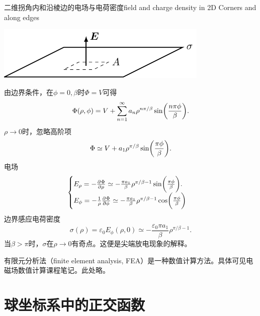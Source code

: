 \begin{example}{二维拐角内和沿棱边的电场与电荷密度}{field and charge density in 2D Corners and along edges}
    \begin{center}
        \includegraphics[page=13]{figures/tikz/layouts.pdf}
    \end{center}
    由边界条件，在$\phi=0,\beta$时$\Phi=V$可得
    \begin{equation}
        \Phi(\rho,\phi)=V+\sum_{n=1}^\infty a_n\rho^{n\pi/\beta}\sin\biggl(\frac{n\pi\phi}\beta\biggr).
    \end{equation}
    $\rho\to0$时，忽略高阶项
    \[
        \Phi\simeq V+a_1\rho^{\pi/\beta}\sin\biggl(\frac{\pi\phi}\beta\biggr).
    \]
    电场 
    \begin{equation}
        \begin{cases}
            E_\rho=-\frac{\partial^{{}}\Phi}{\partial{\rho}^{{}}}\simeq-\frac{\pi a_1}\beta\rho^{\pi/\beta-1}\sin\biggl(\frac{\pi\phi}\beta\biggr).\\
            E_\phi=-\frac1\rho\frac{\partial^{{}}\Phi}{\partial{\phi}^{{}}}\simeq-\frac{\pi a_1}\beta\rho^{\pi/\beta-1}\cos\biggl(\frac{\pi\phi}\beta\biggr)
        \end{cases}
    \end{equation}
    边界感应电荷密度
    \begin{equation}
        \sigma(\rho)=\varepsilon_0E_\phi(\rho,0)\simeq-\frac{\varepsilon_0\pi a_1}\beta\rho^{\pi/\beta-1}.
    \end{equation}
    当$\beta>\pi$时，$\sigma$在$\rho\to0$有奇点。这便是尖端放电现象的解释。
\end{example}

\label{sec:finite element analysis}

有限元分析法（finite element analysis, FEA）是一种数值计算方法。具体可见电磁场数值计算课程笔记。此处略。

\clearpage

\section{球坐标系中的正交函数}
\label{sec:laplace equation in spherical coordinate}

